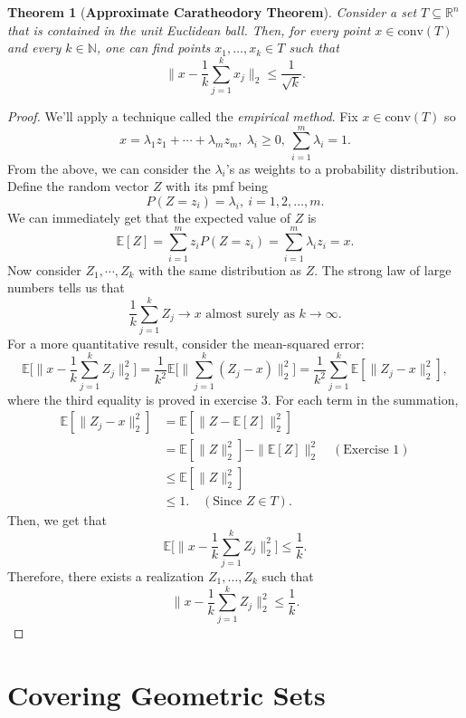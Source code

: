 \documentclass{article}
\newtheorem*{theorem}{Theorem}
\theoremstyle{definition}
\begin{document}
\begin{theorem}[\textbf{Approximate Caratheodory Theorem}]
Consider a set $T \subseteq \mathbb{R}^n$ that is contained in the unit Euclidean ball. Then, for every point 
$x \in \text{conv}(T)$ and every $k \in \mathbb{N}$, one can find points $x_1, \dots, x_k \in T$ such that 
\[ \bigg\| x - \frac{1}{k} \sum_{j = 1}^{k} x_j \bigg\|_2 \leq \frac{1}{\sqrt{k}}. \]
\end{theorem}

\begin{proof}
We'll apply a technique called the \textit{empirical method}. Fix $x \in \text{conv}(T)$ so 
\[ x = \lambda_1 z_1 + \cdots + \lambda_m z_m, \ \lambda_i \geq 0, \ \sum_{i = 1}^{m} \lambda_i = 1. \]
From the above, we can consider the $\lambda_i$'s as weights to a probability distribution. Define the random 
vector $Z$ with its pmf being 
\[ P(Z = z_i) = \lambda_i, \ i = 1, 2, \dots, m. \]
We can immediately get that the expected value of $Z$ is 
\[ \mathbb{E}[Z] = \sum_{i = 1}^{m} z_i P(Z = z_i) = \sum_{i = 1}^{m} \lambda_i z_i = x. \]
Now consider $Z_1, \cdots, Z_k$ with the same distribution as $Z$. The strong law of large numbers tells us that 
\[ \frac{1}{k}\sum_{j = 1}^{k} Z_j \to x \text{  almost surely as  } k \to \infty. \]
For a more quantitative result, consider the mean-squared error:
\[ \mathbb{E}\biggl[ \bigg\| x - \frac{1}{k}\sum_{j = 1}^{k}Z_j \bigg\|_2^2 \biggr] 
= \frac{1}{k^2} \mathbb{E}\biggl[ \bigg\| \sum_{j = 1}^{k} (Z_j - x) \bigg\|_2^2 \biggr] 
= \frac{1}{k^2} \sum_{j = 1}^{k} \mathbb{E}[\| Z_j - x \|_2^2], \]
where the third equality is proved in exercise 3. For each term in the summation, 
\begin{align*}
	\mathbb{E}[\|Z_j - x\|_2^2] 
	&= \mathbb{E}[\|Z - \mathbb{E}[Z]\|_2^2] \\
	&= \mathbb{E}[\|Z\|_2^2] - \|\mathbb{E}[Z]\|_2^2 \quad (\text{Exercise 1}) \\
	&\leq \mathbb{E}[\|Z\|_2^2] \\
	&\leq 1. \quad (\text{Since } Z \in T).
\end{align*}
Then, we get that 
\[ \mathbb{E}\biggl[ \bigg\| x - \frac{1}{k}\sum_{j = 1}^{k}Z_j \bigg\|_2^2 \biggr] \leq \frac{1}{k}. \]
Therefore, there exists a realization $Z_1, \dots, Z_k$ such that 
\[ \bigg\| x - \frac{1}{k}\sum_{j = 1}^{k}Z_j \bigg\|_2^2 \leq \frac{1}{k}. \]
\end{proof}


\section*{Covering Geometric Sets}
\end{document}
